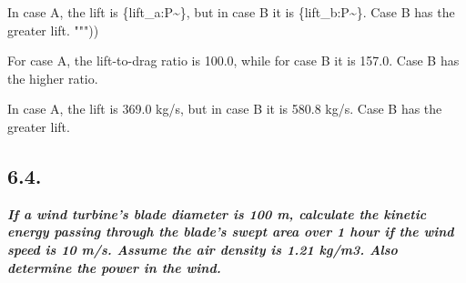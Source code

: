 \documentclass[
  letterpaper,
  DIV=11,
  numbers=noendperiod]{scrartcl}
\newenvironment{Shaded}{\begin{snugshade}}{\end{snugshade}}
\newcommand{\NormalTok}[1]{\textcolor[rgb]{0.00,0.23,0.31}{#1}}
\newcommand{\OperatorTok}[1]{\textcolor[rgb]{0.37,0.37,0.37}{#1}}
\newcommand{\SpecialCharTok}[1]{\textcolor[rgb]{0.37,0.37,0.37}{#1}}
\newcommand{\SpecialStringTok}[1]{\textcolor[rgb]{0.13,0.47,0.30}{#1}}
\begin{document}
\begin{Shaded}
\begin{Highlighting}[]
\SpecialStringTok{In case A, the lift is }\SpecialCharTok{\{}\NormalTok{lift\_a}\SpecialCharTok{:}\NormalTok{P}\OperatorTok{\textasciitilde{}}\SpecialCharTok{\}}\SpecialStringTok{, but in case B it is }\SpecialCharTok{\{}\NormalTok{lift\_b}\SpecialCharTok{:}\NormalTok{P}\OperatorTok{\textasciitilde{}}\SpecialCharTok{\}}\SpecialStringTok{. Case B has the greater lift. }
\SpecialStringTok{"""}\NormalTok{))}
\end{Highlighting}
\end{Shaded}

For case A, the lift-to-drag ratio is 100.0, while for case B it is
157.0. Case B has the higher ratio.

In case A, the lift is 369.0 kg/s, but in case B it is 580.8 kg/s. Case
B has the greater lift.

\hypertarget{section-1}{%
\subsection{6.4.}\label{section-1}}

\textbf{\emph{If a wind turbine's blade diameter is 100 m, calculate the
kinetic energy passing through the blade's swept area over 1 hour if the
wind speed is 10 m/s. Assume the air density is 1.21 kg/m3. Also
determine the power in the wind.}}
\end{document}
